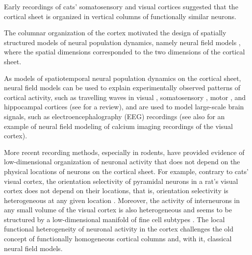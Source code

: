 \documentclass[10pt,letterpaper]{article}
\begin{document}


Early recordings of cats' somatosensory \cite{Mou57} and visual \cite{HubWie62} cortices suggested that the cortical sheet is organized in vertical columns of functionally similar neurons.

The columnar organization of the cortex motivated the design of spatially structured models of neural population dynamics, namely neural field models \cite{WilCow73,Nun74,Ama77}, where the spatial dimensions corresponded to the two dimensions of the cortical sheet. 

As models of spatiotemporal neural population dynamics on the cortical sheet, neural field models can be used to explain experimentally observed patterns of cortical activity, such as travelling waves in visual \cite{SatNau12,MulRey14}, somatosensory \cite{PetHah03,FerBol06}, motor \cite{RubRob06,TakKim15}, and hippocampal \cite{LubSia09,PatFuj12,PatSch13} cortices (see \cite{MulCha18} for a review), and are used to model large-scale brain signals, such as electroencephalography (EEG) recordings \cite{Bre17} (see also \cite{DipRan18} for an example of neural field modeling of calcium imaging recordings of the visual cortex).

More recent recording methods, especially in rodents, have provided evidence of low-dimensional organization of neuronal activity that does not depend on the physical locations of neurons on the cortical sheet. For example, contrary to cats' visual cortex, the orientation selectivity of pyramidal neurons in a rat's visual cortex does not depend on their locations, that is, orientation selectivity is heterogeneous at any given location \cite{OhkChu05}. Moreover, the activity of interneurons in any small volume of the visual cortex is also heterogeneous and seems to be structured by a low-dimensional manifold of fine cell subtypes \cite{BugDuf22}. The local functional heterogeneity of neuronal activity in the cortex challenges the old concept of functionally homogeneous cortical columns and, with it, classical neural field models. 
\end{document}

